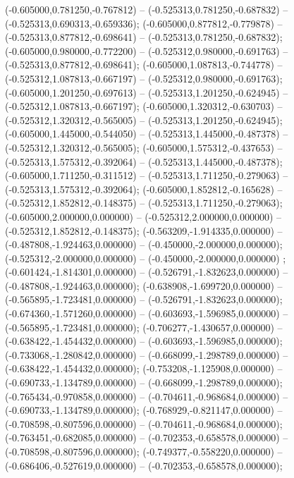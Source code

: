  (-0.605000,0.781250,-0.767812) -- (-0.525313,0.781250,-0.687832) -- (-0.525313,0.690313,-0.659336);
 (-0.605000,0.877812,-0.779878) -- (-0.525313,0.877812,-0.698641) -- (-0.525313,0.781250,-0.687832);
 (-0.605000,0.980000,-0.772200) -- (-0.525312,0.980000,-0.691763) -- (-0.525313,0.877812,-0.698641);
 (-0.605000,1.087813,-0.744778) -- (-0.525312,1.087813,-0.667197) -- (-0.525312,0.980000,-0.691763);
 (-0.605000,1.201250,-0.697613) -- (-0.525313,1.201250,-0.624945) -- (-0.525312,1.087813,-0.667197);
 (-0.605000,1.320312,-0.630703) -- (-0.525312,1.320312,-0.565005) -- (-0.525313,1.201250,-0.624945);
 (-0.605000,1.445000,-0.544050) -- (-0.525313,1.445000,-0.487378) -- (-0.525312,1.320312,-0.565005);
 (-0.605000,1.575312,-0.437653) -- (-0.525313,1.575312,-0.392064) -- (-0.525313,1.445000,-0.487378);
 (-0.605000,1.711250,-0.311512) -- (-0.525313,1.711250,-0.279063) -- (-0.525313,1.575312,-0.392064);
 (-0.605000,1.852812,-0.165628) -- (-0.525312,1.852812,-0.148375) -- (-0.525313,1.711250,-0.279063);
 (-0.605000,2.000000,0.000000) -- (-0.525312,2.000000,0.000000) -- (-0.525312,1.852812,-0.148375);
 (-0.563209,-1.914335,0.000000) -- (-0.487808,-1.924463,0.000000) -- (-0.450000,-2.000000,0.000000);
 (-0.525312,-2.000000,0.000000) -- (-0.450000,-2.000000,0.000000) ;
 (-0.601424,-1.814301,0.000000) -- (-0.526791,-1.832623,0.000000) -- (-0.487808,-1.924463,0.000000);
 (-0.638908,-1.699720,0.000000) -- (-0.565895,-1.723481,0.000000) -- (-0.526791,-1.832623,0.000000);
 (-0.674360,-1.571260,0.000000) -- (-0.603693,-1.596985,0.000000) -- (-0.565895,-1.723481,0.000000);
 (-0.706277,-1.430657,0.000000) -- (-0.638422,-1.454432,0.000000) -- (-0.603693,-1.596985,0.000000);
 (-0.733068,-1.280842,0.000000) -- (-0.668099,-1.298789,0.000000) -- (-0.638422,-1.454432,0.000000);
 (-0.753208,-1.125908,0.000000) -- (-0.690733,-1.134789,0.000000) -- (-0.668099,-1.298789,0.000000);
 (-0.765434,-0.970858,0.000000) -- (-0.704611,-0.968684,0.000000) -- (-0.690733,-1.134789,0.000000);
 (-0.768929,-0.821147,0.000000) -- (-0.708598,-0.807596,0.000000) -- (-0.704611,-0.968684,0.000000);
 (-0.763451,-0.682085,0.000000) -- (-0.702353,-0.658578,0.000000) -- (-0.708598,-0.807596,0.000000);
 (-0.749377,-0.558220,0.000000) -- (-0.686406,-0.527619,0.000000) -- (-0.702353,-0.658578,0.000000);
